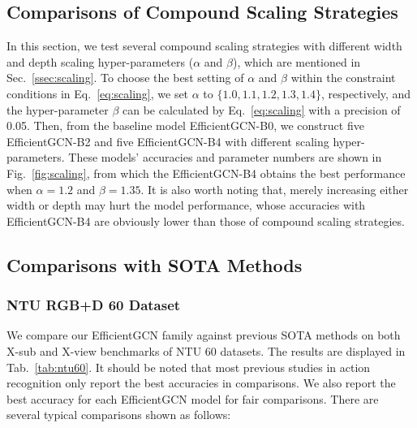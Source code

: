 \documentclass[10pt,journal,compsoc]{IEEEtran}
\begin{document}
\subsection{Comparisons of Compound Scaling Strategies}
\label{ssec:compound}

In this section, we test several compound scaling strategies with different width and depth scaling hyper-parameters ($\alpha$ and $\beta$), which are mentioned in Sec.~\ref{ssec:scaling}. To choose the best setting of $\alpha$ and $\beta$ within the constraint conditions in Eq.~\ref{eq:scaling}, we set $\alpha$ to $\{1.0, 1.1, 1.2, 1.3, 1.4\}$, respectively, and the hyper-parameter $\beta$ can be calculated by Eq.~\ref{eq:scaling} with a precision of 0.05. Then, from the baseline model EfficientGCN-B0, we construct five EfficientGCN-B2 and five EfficientGCN-B4 with different scaling hyper-parameters. These models' accuracies and parameter numbers are shown in Fig.~\ref{fig:scaling}, from which the EfficientGCN-B4 obtains the best performance when $\alpha=1.2$ and $\beta=1.35$. It is also worth noting that, merely increasing either width or depth may hurt the model performance, whose accuracies with EfficientGCN-B4 are obviously lower than those of compound scaling strategies.

\subsection{Comparisons with SOTA Methods}
\label{ssec:comparisons}

\subsubsection{NTU RGB+D 60 Dataset}
\label{sssec:ntu60}

We compare our EfficientGCN family against previous SOTA methods on both X-sub and X-view benchmarks of NTU 60 datasets. The results are displayed in Tab.~\ref{tab:ntu60}. It should be noted that most previous studies in action recognition only report the best accuracies in comparisons. We also report the best accuracy for each EfficientGCN model for fair comparisons. There are several typical comparisons shown as follows:
\end{document}
